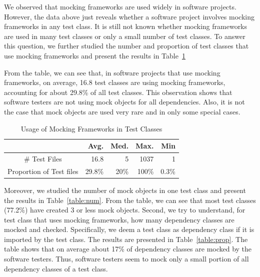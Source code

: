 We observed that mocking frameworks are used widely in software projects. However, the data above just reveals whether a software project involves mocking frameworks in any test class. It is still not known whether mocking frameworks are used in many test classes or only  a small number of test classes. To answer this question, we further studied the number and proportion of test classes that use mocking frameworks and present the results in Table~\ref{table:testclass}

From the table, we can see that, in software projects that use mocking frameworks, on average, 16.8 test classes are using mocking frameworks, accounting for about 29.8\% of all test classes. This observation shows that software testers are not using mock objects for all dependencies. Also, it is not the case that mock objects are used very rare and in only some special cases. 

\begin{table}
\caption{Usage of Mocking Frameworks in Test Classes}
\small

\label{table:testclass}
\centering
\begin{tabular}{|c|r|r|r|r|}
\hline
 & Avg. & Med. & Max. & Min\\
\hline
\# Test Files &16.8&5&1037&1\\
Proportion of Test files &29.8\%&20\%&100\%&0.3\%\\
\hline
\end{tabular}

\end{table}

Moreover, we studied the number of mock objects in one test class and present the results in Table~\ref{table:num}. From the table, we can see that most test classes (77.2\%) have created 3 or less mock objects. Second, we try to understand, for test class that uses mocking frameworks, how many dependency classes are mocked and checked. Specifically, we deem a test class as dependency class if it is imported by the test class. The results are presented in Table~\ref{table:prop}. The table shows that on average about 17\% of dependency classes are mocked by the software testers. Thus, software testers seem to mock only a small portion of all dependency classes of a test class. 

